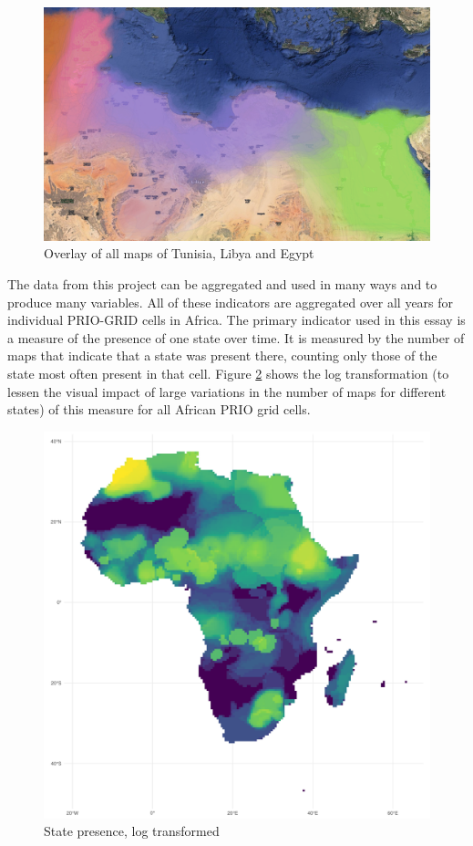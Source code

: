 \documentclass[12pt]{article}
\begin{document}
\begin{figure}[!htb]
	\includegraphics[width=\textwidth,keepaspectratio]{../TUNLIBEGY.pdf}
	\caption{Overlay of all maps of Tunisia, Libya and Egypt}
	\label{overlay}
\end{figure}

The data from this project can be aggregated and used in many ways and to
produce many variables. All of these indicators are aggregated over all years
for individual PRIO-GRID cells in Africa. The primary indicator used in this
essay is a measure of the presence of one state over time. It is measured by the
number of maps that indicate that a state was present there, counting only those
of the state most often present in that cell. Figure \ref{Sp} shows the log
transformation (to lessen the visual impact of large variations in the number of
maps for different states) of this measure for all African PRIO grid cells.

\begin{figure}[htpb]
	\centering
	\includegraphics[width=0.8\linewidth]{../Rplot_ln_sp_int.pdf}
	\caption{State presence, log transformed}
	\label{Sp}
\end{figure}
\end{document}
